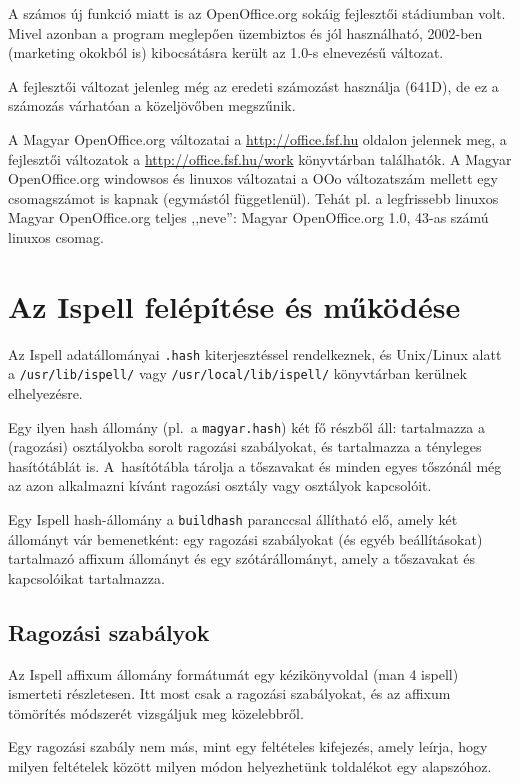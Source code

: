 A számos új funkció miatt is az OpenOffice.org sokáig
fejlesztői stádiumban volt. Mivel azonban a program meglepően
üzembiztos és jól használható, 2002-ben (marketing okokból is)
kibocsátásra került az 1.0-s elnevezésű változat.

A fejlesztői változat jelenleg
még az eredeti számozást használja (641D), de ez a számozás
várhatóan a közeljövőben megszűnik.

A Magyar OpenOffice.org változatai a \url{http://office.fsf.hu}
oldalon jelennek meg, a fejlesztői változatok a
\url{http://office.fsf.hu/work} könyvtárban találhatók. A Magyar
OpenOffice.org windowsos és linuxos változatai a OOo változatszám
mellett egy csomagszámot is kapnak (egymástól függetlenül).
Tehát pl. a legfrissebb linuxos Magyar OpenOffice.org
teljes ,,neve'': Magyar OpenOffice.org 1.0, 
43-as számú linuxos csomag.

\section{Az Ispell felépítése és működése}

Az Ispell adatállományai \texttt{.hash} kiterjesztéssel rendelkeznek, és
Unix/Linux alatt a \texttt{/usr/lib/ispell/} vagy \texttt{/usr/local/lib/ispell/}
könyvtárban kerülnek elhelyezésre.

Egy ilyen hash állomány (pl.\ a \texttt{magyar.hash}) két
fő részből áll: tartalmazza a (ragozási) osztályokba sorolt
ragozási szabályokat, és tartalmazza a tényleges hasítótáblát
is. A~hasítótábla tárolja a tőszavakat és minden egyes tőszónál
még az azon alkalmazni kívánt ragozási osztály vagy osztályok
kapcsolóit.

Egy Ispell hash-állomány a \texttt{buildhash} paranccsal állítható
elő, amely két állományt vár bemenetként: egy
ragozási szabályokat (és egyéb beállításokat) tartalmazó
affixum állományt és egy szótárállományt, amely a tőszavakat
és kapcsolóikat tartalmazza.

\subsection{Ragozási szabályok}

Az Ispell affixum állomány formátumát egy kézikönyvoldal (man 4
ispell) ismerteti részletesen. Itt most csak a ragozási szabályokat,
és az affixum tömörítés módszerét vizsgáljuk meg közelebbről.

Egy ragozási szabály nem más, mint egy feltételes
kifejezés, amely leírja, hogy milyen feltételek között
milyen módon helyezhetünk toldalékot egy alapszóhoz.

